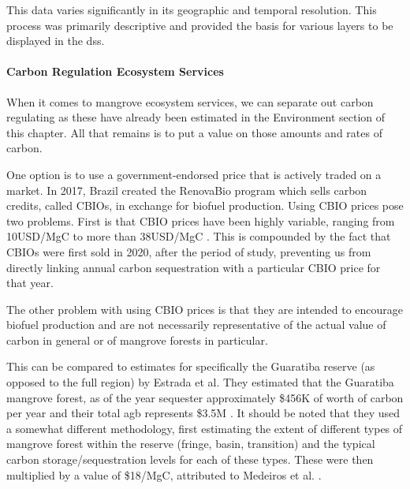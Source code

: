 This data varies significantly in its geographic and temporal resolution. This process was primarily descriptive and provided the basis for various layers to be displayed in the \ac{dss}.

\paragraph{Carbon Regulation Ecosystem Services} \leavevmode\newline

When it comes to mangrove ecosystem services, we can separate out carbon regulating as these have already been estimated in the Environment section of this chapter. All that remains is to put a value on those amounts and rates of carbon.

One option is to use a government-endorsed price that is actively traded on a market. In 2017, Brazil created the RenovaBio program which sells carbon credits, called CBIOs, in exchange for biofuel production. Using CBIO prices pose two problems. First is that CBIO prices have been highly variable, ranging from 10USD/MgC \cite{castroBrazilianCarbonCredit2020} to more than 38USD/MgC \cite{barrosBiofuelsAnnual2022}. This is compounded by the fact that CBIOs were first sold in 2020, after the period of study, preventing us from directly linking annual carbon sequestration with a particular CBIO price for that year.

The other problem with using CBIO prices is that they are intended to encourage biofuel production and are not necessarily representative of the actual value of carbon in general or of mangrove forests in particular.   

This can be compared to estimates for specifically the Guaratiba reserve (as opposed to the full region) by Estrada et al. They estimated that the Guaratiba mangrove forest, as of the year  sequester approximately \$456K of worth of carbon per year and their total \ac{agb} represents \$3.5M \cite{estradaEconomicEvaluationCarbon2015}. It should be noted that they used a somewhat different methodology, first estimating the extent of different types of mangrove forest within the reserve (fringe, basin, transition) and the typical carbon storage/sequestration levels for each of these types. These were then multiplied by a value of \$18/MgC, attributed to Medeiros et al. \cite{medeirosContribuicaoUnidadesConservacao2011}. 

